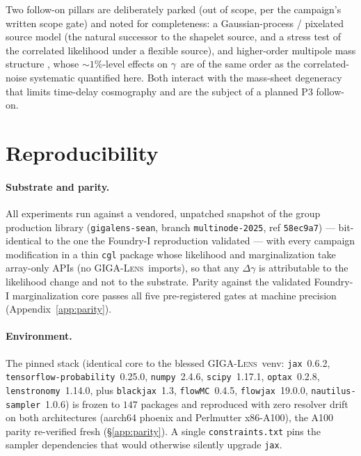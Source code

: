 \documentclass[11pt,letterpaper]{article}
\newcommand{\gammaEPL}{\ensuremath{\gamma}}
\newcommand{\gigalens}{\textsc{GIGA-Lens}}
\begin{document}
Two follow-on pillars are deliberately parked (out of scope, per the campaign's
written scope gate) and noted for completeness: a Gaussian-process / pixelated
source model (the natural successor to the shapelet source, and a stress test of
the correlated likelihood under a flexible source), and higher-order multipole
mass structure \citep{vandevyvere2022multipoles,powell2022multipoles}, whose
$\sim$$1\%$-level effects on \gammaEPL\ are of the same order as the
correlated-noise systematic quantified here. Both interact with the mass-sheet
degeneracy that limits time-delay cosmography \citep{tdcosmo4} and are the
subject of a planned P3 follow-on.

\section{Reproducibility}
\label{sec:repro}

\paragraph{Substrate and parity.} All experiments run against a vendored,
unpatched snapshot of the group production library (\texttt{gigalens-sean},
branch \texttt{multinode-2025}, ref \texttt{58ec9a7}) --- bit-identical to the
one the Foundry-I reproduction validated --- with every campaign modification in
a thin \texttt{cgl} package whose likelihood and marginalization take array-only
APIs (no \gigalens\ imports), so that any $\Delta\gammaEPL$ is attributable to
the likelihood change and not to the substrate. Parity against the validated
Foundry-I marginalization core passes all five pre-registered gates at machine
precision (Appendix~\ref{app:parity}).

\paragraph{Environment.} The pinned stack (identical core to the blessed
\gigalens\ venv: \texttt{jax}~0.6.2, \texttt{tensorflow-probability}~0.25.0,
\texttt{numpy}~2.4.6, \texttt{scipy}~1.17.1, \texttt{optax}~0.2.8,
\texttt{lenstronomy}~1.14.0, plus \texttt{blackjax}~1.3, \texttt{flowMC}~0.4.5,
\texttt{flowjax}~19.0.0, \texttt{nautilus-sampler}~1.0.6) is frozen to
$147$ packages and reproduced with zero resolver drift on both architectures
(aarch64 phoenix and Perlmutter x86-A100), the A100 parity re-verified fresh
(\S\ref{app:parity}). A single \texttt{constraints.txt} pins the sampler
dependencies that would otherwise silently upgrade \texttt{jax}.
\end{document}
